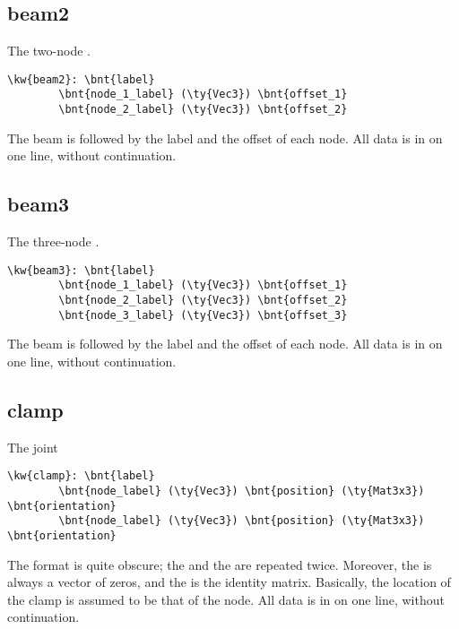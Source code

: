 \subsection{beam2}
The two-node .
\begin{Verbatim}[commandchars=\\\{\}]
    \kw{beam2}: \bnt{label}
        \bnt{node_1_label} (\ty{Vec3}) \bnt{offset_1}
        \bnt{node_2_label} (\ty{Vec3}) \bnt{offset_2}
\end{Verbatim}
The beam  is followed by the label and the offset of each node.
All data is in on one line, without continuation.

\subsection{beam3}
The three-node .
\begin{Verbatim}[commandchars=\\\{\}]
    \kw{beam3}: \bnt{label}
        \bnt{node_1_label} (\ty{Vec3}) \bnt{offset_1}
        \bnt{node_2_label} (\ty{Vec3}) \bnt{offset_2}
        \bnt{node_3_label} (\ty{Vec3}) \bnt{offset_3}
\end{Verbatim}
The beam  is followed by the label and the offset of each node.
All data is in on one line, without continuation.

\subsection{clamp}
The  joint
\begin{Verbatim}[commandchars=\\\{\}]
    \kw{clamp}: \bnt{label}
        \bnt{node_label} (\ty{Vec3}) \bnt{position} (\ty{Mat3x3}) \bnt{orientation}
        \bnt{node_label} (\ty{Vec3}) \bnt{position} (\ty{Mat3x3}) \bnt{orientation}
\end{Verbatim}
The format is quite obscure; the  and the 
are repeated twice.
Moreover, the  is always a vector of zeros,
and the  is the identity matrix.
Basically, the location of the clamp is assumed to be that of the node.
All data is in on one line, without continuation.

